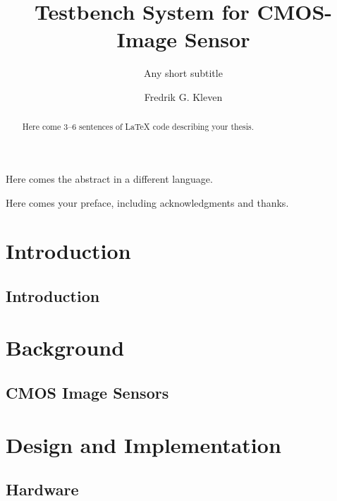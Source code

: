 \documentclass[UKenglish]{uiomasterthesis}  %
\title{Testbench System for CMOS-Image Sensor}        %
\subtitle{Any short subtitle}         %
\author{Fredrik G. Kleven}                      %
\begin{document}
\uiomasterfp[dept={Department of Physics},  %
  program={Electronics, Informatics and Technology},                        %
  supervisor={Philipp Häfliger},               %
  long]                                     %

\frontmatter{}
\begin{abstract}
  Here come 3--6 sentences of \LaTeX{}\cite{LaTeX-original} code
  describing your thesis.
\end{abstract}

\begin{xabstract}[Sammendrag]               %
  Here comes the abstract in a different language.
\end{xabstract}

\tableofcontents{}                          %
\listoffigures{}                            %
\listoftables{}                             %

\begin{preface}
  Here comes your preface, including acknowledgments and thanks.
\end{preface}

\mainmatter{}

\part{Introduction}
\chapter{Introduction}


\part{Background}
\chapter{CMOS Image Sensors}


\part{Design and Implementation}
\chapter{Hardware}

\end{document}
